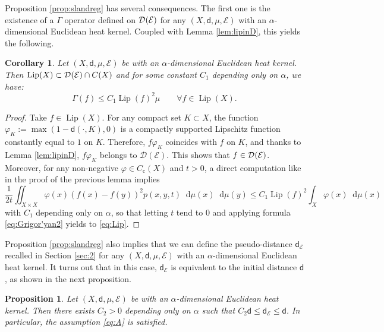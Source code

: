 \documentclass[JEP,XML,SOM,Unicode,published]{cedram}
\newcommand{\rmc}{\mathrm{c}}
\newcommand{\NoChangel}[1]{%
\expandafter\let\csname old\string#1\endcsname=#1
\let#1=\relax
\newcommand{#1}{\mathcode`l="716C\csname old\string#1\endcsname\mathcode`l="7160 }%
}
\theoremstyle{plain}
\newtheorem{proposition}[theorem]{Proposition}
\newtheorem{corollary}[theorem]{Corollary}
\theoremstyle{definition}
\newcommand{\cE}{\mathcal{E}}
\newcommand{\cD}{\mathcal{D}}
\let\phi\varphi
\newcommand{\di}{\mathop{}\!\mathrm{d}}
\newcommand{\loc}{\mathrm{loc}}\NoChangel{\loc}
\DeclareMathOperator{\Lip}{Lip}
\newcommand{\dist}{\mathsf{d}}
\begin{document}
Proposition \ref{prop:slandreg} has several consequences. The first one is the existence of a $\Gamma$ operator defined on $\cD_{\loc}(\cE)$ for any $(X,\dist,\mu,\cE)$ with an $\alpha$-dimensional Euclidean heat kernel. Coupled with Lemma \ref{lem:lipinD}, this yields the following.

\begin{corollary}\label{cor:1}
Let $(X,\dist,\mu,\cE)$ be with an $\alpha$-dimensional Euclidean heat kernel. Then $\Lip(X) \subset \cD_{\loc}(\cE)\cap C(X)$ and for some constant $C_1$ depending only on $\alpha$, we have:
\begin{equation}\label{eq:Lip}
\Gamma(f) \le C_1 \Lip(f)^2 \mu \qquad \forall f \in \Lip(X).
\end{equation}
\end{corollary}

\begin{proof}
Take $f \in \Lip(X)$. For any compact set $K \subset X$, the function $\phi_K:=\max(1-\dist(\cdot,K),0)$ is a compactly supported Lipschitz function constantly equal to $1$ on $K$. Therefore, $f \phi_K$ coincides with $f$ on $K$, and thanks to Lemma \ref{lem:lipinD}, $f \phi_K$ belongs to $\cD(\cE)$. This shows that $f \in \cD_{\loc}(\cE)$. Moreover, for any non-negative $\phi \in C_\rmc(X)$ and $t>0$, a direct computation like in the proof of the previous lemma implies
\[
\frac{1}{2t} \iint_{X\times X} \phi(x)(f(x)-f(y))^2 p(x,y,t) \di \mu(x) \di \mu(y) \le C_1 \Lip(f)^2 \int_X \phi(x) \di \mu(x)
\]
with $C_1$ depending only on $\alpha$, so that letting $t$ tend to $0$ and applying formula \eqref{eq:Grigor'yan2} yields to \eqref{eq:Lip}.
\end{proof}

Proposition \ref{prop:slandreg} also implies that we can define the pseudo-distance $\dist_\cE$ recalled in Section \ref{sec:2} for any $(X,\dist,\mu,\cE)$ with an $\alpha$-dimensional Euclidean heat kernel. It turns out that in this case, $\dist_\cE$ is equivalent to the initial distance $\dist$, as shown in the next proposition.

\begin{proposition}\label{eq:propA}
Let $(X,\dist,\mu,\cE)$ be with an $\alpha$-dimensional Euclidean heat kernel. Then there exists $C_2>0$ depending only on $\alpha$ such that $C_2 \dist \le \dist_{\cE} \le \dist$. In particular, the assumption \eqref{eq:A} is satisfied.
\end{proposition}
\end{document}

